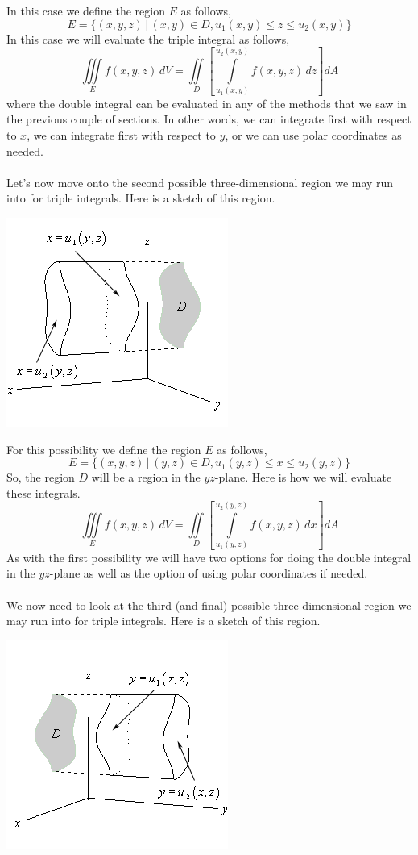 \documentclass[10pt,reqno]{book}
\theoremstyle{definition}
\begin{document}
	In this case we define the region $ E $ as follows,
	\[ E = \{ (x,y,z) \, \lvert \, (x,y) \in D, u_1(x,y) \leq z \leq u_2(x,y) \} \]
	In this case we will evaluate the triple integral as follows,
	\[ \iiint\limits_E f(x,y,z)\,dV = \iint\limits_D \left[ \int\limits_{u_1(x,y)}^{u_2(x,y)} f(x,y,z)\,dz \right]dA \]
	where the double integral can be evaluated in any of the methods that we saw in the previous couple of sections. In other words, we can integrate first with respect to $ x $, we can integrate first with respect to $ y $, or we can use polar coordinates as needed. \\ \\
	Let's now move onto the second possible three-dimensional region we may run into for triple integrals. Here is a sketch of this region.
	\begin{center}
		\includegraphics[scale=0.6]{trip2.png}
	\end{center}
	For this possibility we define the region $ E $ as follows,
	\[ E = \{ (x,y,z) \, \lvert \, (y,z) \in D, u_1(y,z) \leq x \leq u_2(y,z) \} \]
	So, the region $ D $ will be a region in the $ yz $-plane. Here is how we will evaluate these integrals.
	\[ \iiint\limits_E f(x,y,z)\,dV = \iint\limits_D \left[ \int\limits_{u_1(y,z)}^{u_2(y,z)} f(x,y,z)\,dx \right]dA \]
	As with the first possibility we will have two options for doing the double integral in the $ yz $-plane as well as the option of using polar coordinates if needed.\\ \\
	We now need to look at the third (and final) possible three-dimensional region we may run into for triple integrals. Here is a sketch of this region.
	\begin{center}
		\includegraphics[scale=0.6]{trip3.png}
	\end{center}
\end{document}
